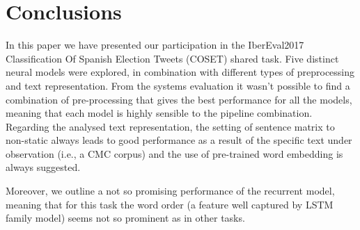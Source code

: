\section{Conclusions} \label{sec:conclusion}

In this paper we have presented our participation in the IberEval2017 Classification Of Spanish Election Tweets (COSET) shared task. Five distinct neural models were explored, in combination with different types of preprocessing and text representation.
From the systems evaluation it wasn't possible to find a combination of pre-processing that gives the best performance for all the models, meaning that each model is highly sensible to the pipeline combination.
Regarding the analysed text representation, the setting of sentence matrix to non-static always leads to good performance as a result of the specific text under observation (i.e., a CMC corpus) and the use of pre-trained word embedding is always suggested.
\begin{comment}
Moreover, the use of pre-trained word embedding is always suggested. %
\end{comment}
Moreover, we outline a not so promising performance of the recurrent model, meaning that for this task the word order (a feature well captured by LSTM family model) seems not so prominent as in other tasks.